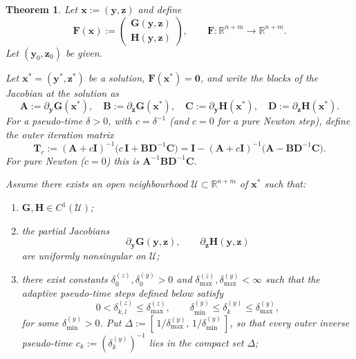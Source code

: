 \documentclass[11pt,a4paper]{article}
\newtheorem{theorem}{Theorem}
\begin{document}
\begin{theorem}
Let $\mathbf{x} := (\mathbf{y}, \mathbf{z})$ and define
\[
\mathbf{F}(\mathbf{x}) :=
\begin{pmatrix}
\mathbf{G}(\mathbf{y}, \mathbf{z}) \\
\mathbf{H}(\mathbf{y}, \mathbf{z})
\end{pmatrix},
\qquad
\mathbf{F} : \mathbb{R}^{n+m} \to \mathbb{R}^{n+m}.
\]
Let $(\mathbf{y}_0,\mathbf{z}_0)$ be given.

Let $\mathbf{x}^* = (\mathbf{y}^*,\mathbf{z}^*)$ be a solution,
$\mathbf F(\mathbf x^*) = \mathbf 0$, and write the blocks of the Jacobian at the solution as
\[
\mathbf A := \partial_{\mathbf y}\mathbf G(\mathbf x^*),\quad
\mathbf B := \partial_{\mathbf z}\mathbf G(\mathbf x^*),\quad
\mathbf C := \partial_{\mathbf y}\mathbf H(\mathbf x^*),\quad
\mathbf D := \partial_{\mathbf z}\mathbf H(\mathbf x^*).
\]
For a pseudo-time $\delta>0$, with $c=\delta^{-1}$ (and $c=0$ for a pure Newton step), define the
\emph{outer iteration matrix}
\[
\mathbf T_c := (\mathbf A + c\mathbf I)^{-1}\bigl(c\,\mathbf I + \mathbf B\mathbf D^{-1}\mathbf C\bigr)
= \mathbf I - (\mathbf A + c\mathbf I)^{-1}\bigl(\mathbf A - \mathbf B\mathbf D^{-1}\mathbf C\bigr).
\]
For pure Newton ($c=0$) this is $\mathbf A^{-1}\mathbf B\mathbf D^{-1}\mathbf C$.

Assume there exists an open neighbourhood $\mathcal U \subset \mathbb{R}^{n+m}$
of $\mathbf{x}^*$ such that:

\begin{enumerate}
\item $\mathbf{G},\mathbf{H} \in C^1(\mathcal U)$;

\item the partial Jacobians
\[
\partial_{\mathbf y}\mathbf G(\mathbf y,\mathbf z),
\qquad
\partial_{\mathbf z}\mathbf H(\mathbf y,\mathbf z)
\]
are uniformly nonsingular on $\mathcal U$;

\item there exist constants
$\delta_0^{(z)}, \delta_0^{(y)} > 0$ and
$\delta_{\max}^{(z)}, \delta_{\max}^{(y)} < \infty$
such that the adaptive pseudo-time steps defined below satisfy
\[
0 < \delta_{k,l}^{(z)} \le \delta_{\max}^{(z)},
\qquad
\delta_{\min}^{(y)} \le \delta_k^{(y)} \le \delta_{\max}^{(y)},
\]
for some $\delta_{\min}^{(y)} > 0$. Put
$\Delta := [\,1/\delta_{\max}^{(y)},\, 1/\delta_{\min}^{(y)}\,]$, so that every outer
inverse pseudo-time $c_k := (\delta_k^{(y)})^{-1}$ lies in the compact set $\Delta$;


\end{enumerate}
\end{theorem}
\end{document}
